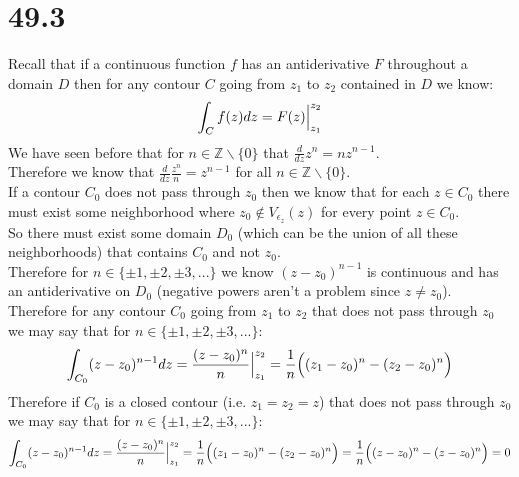 \documentclass{article}
\begin{document}
\section*{49.3}
\begin{center}
    \doublespacing
    Recall that if a continuous function $f$ has an antiderivative $F$ throughout a domain $D$ then for any contour $C$ going from $z_1$ to $z_2$ contained in $D$ we know:
    \[\int _C f(z)dz = F(z)\Big{|}_{z_1}^{z_2}\]
    We have seen before that for $n\in\mathbb{Z}\backslash\{0\}$ that $\frac{d}{dz} z^n = nz^{n-1}$.
    \\Therefore we know that $\frac{d}{dz}\frac{z^n}{n} = z^{n-1}$ for all $n\in\mathbb{Z}\backslash\{0\}$.
    \break
    \\If a contour $C_0$ does not pass through $z_0$ then we know that for each $z\in C_0$ there must exist some neighborhood where $z_0\notin V_{\epsilon _z} (z)$ for every point $z\in C_0$.
    \\So there must exist some domain $D_0$ (which can be the union of all these neighborhoods) that contains $C_0$ and not $z_0$.
    \\Therefore for $n\in\{\pm 1,\pm 2, \pm 3, ...\}$ we know $(z - z_0)^{n-1}$ is continuous and has an antiderivative on $D_0$ (negative powers aren't a problem since $z\neq z_0$).
    \break
    \\Therefore for any contour $C_0$ going from $z_1$ to $z_2$ that does not pass through $z_0$ we may say that for $n\in\{\pm 1,\pm 2,\pm 3, ...\}$:
    \[\int _{C_0} (z - z_0)^{n-1} dz =\frac{(z - z_0)^n}{n}\Big{|}_{z_1}^{z_2} =\frac{1}{n}\Big{(}(z_1 - z_0)^n - (z_2 - z_0)^n\Big{)}\]
    Therefore if $C_0$ is a closed contour (i.e. $z_1 = z_2 = z$) that does not pass through $z_0$ we may say that for $n\in\{\pm 1,\pm 2,\pm 3, ...\}$:
    \[\int _{C_0} (z - z_0)^{n-1} dz =\frac{(z - z_0)^n}{n}\Big{|}_{z_1}^{z_2} =\frac{1}{n}\Big{(}(z_1 - z_0)^n - (z_2 - z_0)^n\Big{)} = \frac{1}{n}\Big{(}(z - z_0)^n - (z - z_0)^n\Big{)} = 0\]
    \qedsymbol
\end{center}


\newpage
\end{document}
